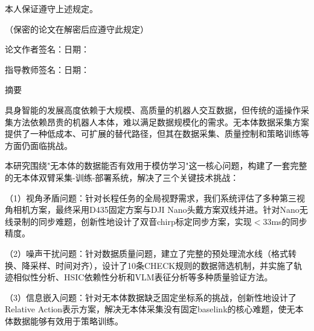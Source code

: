 本人保证遵守上述规定。

\vspace{2cm}

\begin{flushright}
（保密的论文在解密后应遵守此规定）

\vspace{1cm}

论文作者签名：\underline{\hspace{4cm}}\hspace{2em}日期：\underline{\hspace{3cm}}

\vspace{0.5cm}

指导教师签名：\underline{\hspace{4cm}}\hspace{2em}日期：\underline{\hspace{3cm}}
\end{flushright}

\newpage

\setcounter{page}{1}

\begin{center}
{\heiti 摘\hspace{1em}要}
\end{center}

\vspace{0.5cm}


具身智能的发展高度依赖于大规模、高质量的机器人交互数据，但传统的遥操作采集方法依赖昂贵的机器人本体，难以满足数据规模化的需求。无本体数据采集方案提供了一种低成本、可扩展的替代路径，但其在数据采集、质量控制和策略训练等方面仍面临挑战。

本研究围绕"无本体的数据能否有效用于模仿学习"这一核心问题，构建了一套完整的无本体双臂采集-训练-部署系统，解决了三个关键技术挑战：

（1）视角矛盾问题：针对长程任务的全局视野需求，我们系统评估了多种第三视角相机方案，最终采用D435固定方案与DJI Nano头戴方案双线并进。针对Nano无线录制的同步难题，创新性地设计了双音chirp标定同步方案，实现$<$33ms的同步精度。

（2）噪声干扰问题：针对数据质量问题，建立了完整的预处理流水线（格式转换、降采样、时间对齐），设计了10条CHECK规则的数据筛选机制，并实施了轨迹相似性分析、HSIC依赖性分析和VLM表征分析等多种质量验证方法。

（3）信息嵌入问题：针对无本体数据缺乏固定坐标系的挑战，创新性地设计了Relative Action表示方案，解决无本体采集没有固定baselink的核心难题，使无本体数据能够有效用于策略训练。

